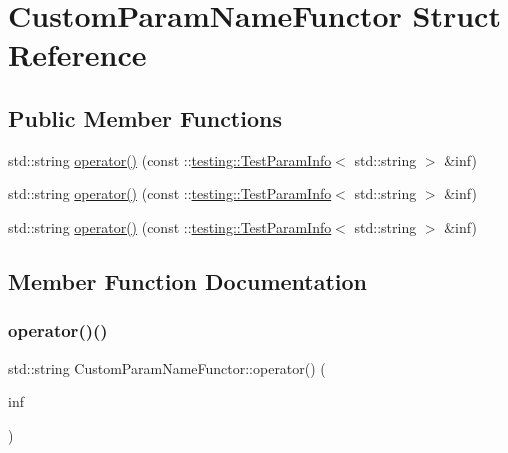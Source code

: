 \hypertarget{struct_custom_param_name_functor}{}\section{Custom\+Param\+Name\+Functor Struct Reference}
\label{struct_custom_param_name_functor}
\subsection*{Public Member Functions}
\begin{DoxyCompactItemize}
\item 
std\+::string \mbox{\hyperlink{struct_custom_param_name_functor_a364d073efd6cb9a05e9d1c97565288ef}{operator()}} (const \+::\mbox{\hyperlink{structtesting_1_1_test_param_info}{testing\+::\+Test\+Param\+Info}}$<$ std\+::string $>$ \&inf)
\item 
std\+::string \mbox{\hyperlink{struct_custom_param_name_functor_a364d073efd6cb9a05e9d1c97565288ef}{operator()}} (const \+::\mbox{\hyperlink{structtesting_1_1_test_param_info}{testing\+::\+Test\+Param\+Info}}$<$ std\+::string $>$ \&inf)
\item 
std\+::string \mbox{\hyperlink{struct_custom_param_name_functor_a364d073efd6cb9a05e9d1c97565288ef}{operator()}} (const \+::\mbox{\hyperlink{structtesting_1_1_test_param_info}{testing\+::\+Test\+Param\+Info}}$<$ std\+::string $>$ \&inf)
\end{DoxyCompactItemize}


\subsection{Member Function Documentation}
\mbox{\label{struct_custom_param_name_functor_a364d073efd6cb9a05e9d1c97565288ef}} 
\subsubsection{\texorpdfstring{operator()()}{operator()()}\hspace{0.1cm}{\footnotesize\ttfamily [1/3]}}
{\footnotesize\ttfamily std\+::string Custom\+Param\+Name\+Functor\+::operator() (\begin{DoxyParamCaption}\item[{const \+::\mbox{\hyperlink{structtesting_1_1_test_param_info}{testing\+::\+Test\+Param\+Info}}$<$ std\+::string $>$ \&}]{inf }\end{DoxyParamCaption})\hspace{0.3cm}{\ttfamily [inline]}}

